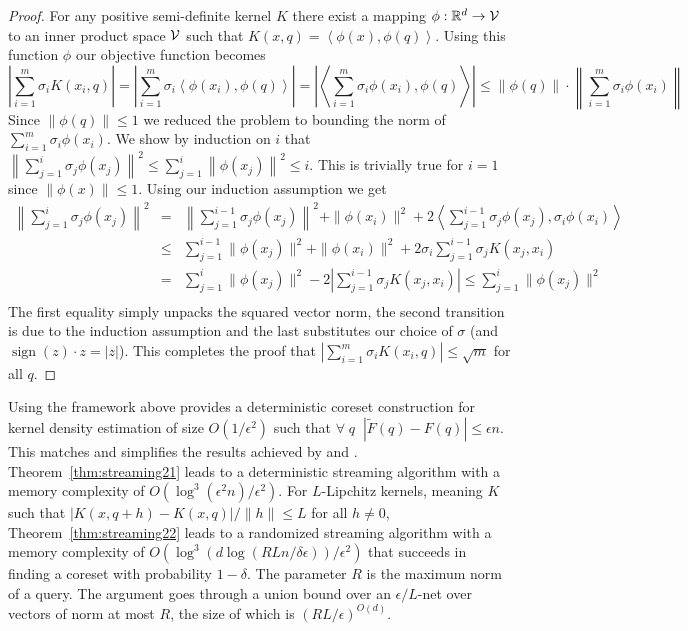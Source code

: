 \documentclass[12pt]{colt2019} %
\newcommand{\ip}[1]{\left \langle #1 \right \rangle}
\newcommand{\R}{\mathbb{R}}
\newcommand{\eps}{\epsilon}
\begin{document}
\begin{proof}
For any positive semi-definite kernel $K$ there exist a mapping $\phi: \R^d \to {\cal V}$ to an inner product space $\cal V$ such that 
$ K(x,q) = \ip{\phi(x), \phi(q)} $.
Using this function $\phi$ our objective function becomes
\[
|\sum_{i=1}^m \sigma_i K(x_i,q)| = |\sum_{i=1}^m \sigma_i \ip{\phi(x_i), \phi(q)} | = \left| \ip{ \sum_{i=1}^m \sigma_i \phi(x_i), \phi(q)}\right| \leq  \|\phi(q)\| \cdot \left\|  \sum_{i=1}^m \sigma_i \phi(x_i) \right\| 
\]
Since $\|\phi(q)\| \leq 1$ we reduced the problem to bounding the norm of $ \sum_{i=1}^m \sigma_i \phi(x_i) $.
%
We show by induction on $i$ that 
$\left\| \sum_{j=1}^i \sigma_j \phi(x_j) \right\|^2 \le \sum_{j=1}^i \left\|\phi(x_j)\right\|^2 \leq i$.
This is trivially true for $i=1$ since $\|\phi(x)\| \leq 1$. 
Using our induction assumption we get
\begin{eqnarray*}
\left\| \sum_{j=1}^{i}\sigma_j \phi(x_j)\right\|^2 &=& \left\|\sum_{j=1}^{i-1}\sigma_j \phi(x_j)\right\|^2 + \|\phi(x_i)\|^2 + 2\ip{ \sum_{j=1}^{i-1}\sigma_j \phi(x_j), \sigma_i \phi(x_i)} \\
&\le& \sum_{j=1}^{i-1} \|\phi(x_j)\|^2 + \|\phi(x_i)\|^2 + 2\sigma_i \sum_{j=1}^{i-1}\sigma_j K(x_j, x_i)\\
&=& \sum_{j=1}^{i} \|\phi(x_j)\|^2 - 2\left| \sum_{j=1}^{i-1}\sigma_j K(x_j, x_i) \right| \le \sum_{j=1}^{i} \|\phi(x_j)\|^2 \\
\end{eqnarray*}
The first equality simply unpacks the squared vector norm, the second transition is due to the induction assumption and the last substitutes our choice of 
$\sigma$ (and $\operatorname{sign}(z)\cdot z =  |z|$). This completes the proof that $|\sum_{i=1}^m \sigma_i K(x_i,q)| \le \sqrt{m}$ for all $q$.
\end{proof}

Using the framework above provides a deterministic coreset construction for kernel density estimation of size $O(1/\eps^2)$ such that $\forall \;q\;\; |\tilde F(q) - F(q)| \le \eps n$. This matches and simplifies the results achieved by \cite{DBLP:conf/soda/PhillipsT18} and \cite{DBLP:journals/corr/abs-1802-01751}. Theorem~\ref{thm:streaming21} leads to a deterministic streaming algorithm with a memory complexity of $O(\log^3(\eps^2 n)/\eps^2)$. For $L$-Lipchitz kernels, meaning $K$ such that $|K(x,q+h) - K(x,q)|/\|h\| \leq L$ for all $h \neq 0$, Theorem~\ref{thm:streaming22} leads to a randomized streaming algorithm with a memory complexity of $O\left(\log^3 \left( d \log\left(RLn/\delta\eps\right) \right) / \eps^2 \right)$ that succeeds in finding a coreset with probability $1-\delta$. The parameter $R$ is the maximum norm of a query. The argument goes through a union bound over an $\eps/L$-net over vectors of norm at most $R$, the size of which is $(RL/\eps)^{O(d)}$.
\end{document}

